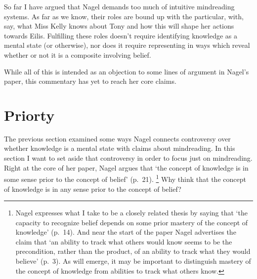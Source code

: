 \documentclass[11pt,a4paper]{extarticle}
\begin{document}
So far I have argued that Nagel demands too much of intuitive mindreading systems.
As far as we know, their roles are bound up with the particular, with, say, what Miss Kelly knows about Tony and how this will shape her actions towards Eilis.
Fulfilling these roles doesn't require identifying knowledge as a mental state (or otherwise),
nor does it require representing in ways which reveal whether or not it is a composite involving belief.

While all of this is intended as an objection to some lines of argument in Nagel's paper, this commentary has yet to reach her core claims.




\section{Priorty}
The previous section examined some ways  Nagel connects  controversy over whether knowledge is a mental state with claims about mindreading.
In this section I want to set aside that controversy in order to focus just on mindreading.
Right at the core of her paper, Nagel argues that  `the concept of knowledge is in some sense prior to the concept of belief' (p.\ 21).%
\footnote{
Nagel expresses what I take to be a closely related thesis by saying that `the capacity to recognize belief depends on some prior mastery of the concept of knowledge' (p.\ 14).
And near the start of the paper Nagel advertises the claim that `an ability to track what others would know seems to be the precondition, rather than the product, of an ability to track what they would believe' (p.\ 3).
As will emerge,
it may be important to distinguish mastery of the concept of knowledge from abilities to track what others know.
}
Why think that the concept of knowledge is in any sense prior to the concept of belief?
\end{document}

